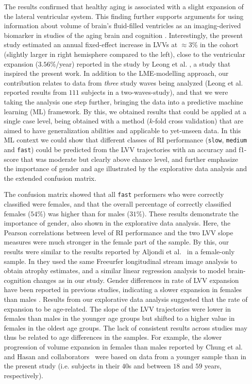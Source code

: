 \documentclass[10pt,letterpaper]{article}
\begin{document}
The results confirmed that healthy aging is associated with a slight expansion of the lateral ventricular system. This finding further supports arguments for using information about volume of brain's fluid-filled ventricles as an imaging-derived biomarker in studies of the aging brain and cognition \cite{Leong2017,Preul2006,Scahill2003,Carmichael2007a, Carmichael2007b,Madsen2015,Todd2017}.
Interestingly, the present study estimated an annual fixed-effect increase in LVVs at $\approx3$\% in the cohort (slightly larger in right hemisphere compared to the left), close to the ventricular expansion ($3.56$\%/year) reported in the study by Leong et al.  \cite{Leong2017}, a study that inspired the present work.
In addition to the LME-modelling approach, our contribution relates to data from {\it three} study waves being analyzed (Leong et al. reported results from $111$ subjects in a two-waves-study), and that we were taking the analysis one step further, bringing the data into a predictive machine learning (ML) framework. 
By this, we obtained results that could be applied at a single case level, being obtained with a method ($k$-fold cross validation) that are aimed to have generalization abilities and applicable to yet-unseen data. In this ML context  we could show that different classes of RI performance ({\tt slow}, {\tt medium} and {\tt fast}) could be predicted from the LVV trajectories with an accuracy and f1-score that was moderate but clearly above chance level, and further emphasize the importance of gender and age illustrated by the explorative data analysis and the extended confusion matrix. 


The confusion matrix showed that all {\tt fast} performers who were correctly classified were females, and that the overall percentage of correctly classified females ($54$\%) was higher than for males ($31$\%). These results demonstrate the importance of gender, also shown in the explorative data analysis. Here, the Pearson correlations between level of RI performance and the two LVV slope measures were much stronger in the female part of the sample. By this, our results were similar to the results reported by Aljondi et al.~\cite{Aljondi2018} in a female-only sample. 
In \cite{Aljondi2018} they used the same Freeurfer longitudinal stream image analysis to obtain atrophy estimates, and a similar linear regression analysis to model brain-cognition changes as in our study. Gender differences in rate of LVV expansion have been reported in previous studies, indicating a slower expansion in females than males \cite{Chung2006, Hasan2014}. Results from our explorative data analysis suggested that the rate of expansion to be age-related. The slope of the LVV trajectories were lower in females than males in the younger age groups but shifted to a higher value in females in the oldest age groups. The lack of consistent results across studies may thus be related to age differences in the samples. For example, the slower progression of volume expansion in females than males reported 
by Chung et al.~\cite{Chung2006} and 
Hasan and collaborators~\cite{Hasan2014} were based on data from a younger sample than in the present study (i.e. subjects in their $40$s and between $18$ and $59$ years, respectively). 
\end{document}
